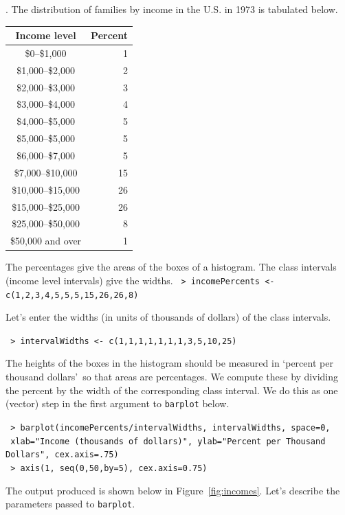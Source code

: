 \documentclass[10pt]{article}
\newcounter{EX}\setcounter{EX}{1}
\newcommand{\EXERCISE}{\arabic{EX}.\stepcounter{EX} }
\begin{document}
\EXERCISE 
The distribution of families by income in the U.S. in 1973 is tabulated below.
\begin{center}
\begin{tabular}{cr}
Income level & Percent\\\hline
\$0--\$1,000 & 1\vphantom{\LARGE Y}\\
\$1,000--\$2,000 & 2\\
\$2,000--\$3,000 & 3\\
\$3,000--\$4,000 & 4\\
\$4,000--\$5,000 & 5\\
\$5,000--\$5,000 & 5\\
\$6,000--\$7,000 & 5\\
\$7,000--\$10,000 & 15\\
\$10,000--\$15,000 & 26\\
\$15,000--\$25,000 & 26\\
\$25,000--\$50,000 & 8\\
\$50,000 and over  & 1
\end{tabular}
\end{center}
The percentages give the areas of the boxes of a histogram.  The class
intervals (income level intervals) give the widths.
\texttt{ > incomePercents <- c(1,2,3,4,5,5,5,15,26,26,8)}\par
Let's enter the widths (in units of 
thousands of dollars) of the class intervals.\par
\texttt{ > intervalWidths <- c(1,1,1,1,1,1,1,3,5,10,25)}\par
The heights of the boxes in the histogram should be measured in
   \lq percent per thousand dollars\rq\ so that areas are percentages.  
We compute these by dividing the percent 
  by the width of the corresponding
  class interval.  We  do this as one (vector) step in the first argument 
  to \texttt{barplot} below.\par
\texttt{ > barplot(incomePercents/intervalWidths, intervalWidths, space=0,}\\ 
{\hbox{\hspace{15pt}}}\texttt{  xlab="Income (thousands of dollars)", ylab="Percent per Thousand Dollars", cex.axis=.75)}\\
\texttt{ > axis(1, seq(0,50,by=5), cex.axis=0.75)}\par
The output produced is shown below in Figure~\ref{fig:incomes}.  
Let's describe the parameters passed to \texttt{barplot}.
\end{document}
